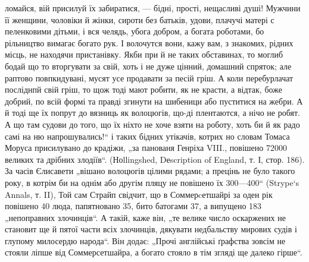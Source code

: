 ломайся, вій присилуй їх забиратися, — бідні, прості, нещасливі душі!
Мужчини її женщини, чоловіки й жінки, сироти без батьків, удови, плачучі
матері с пеленковими дітьми, і вся челядь, убога добром, а богата
роботами, бо рільництво вимагає богато рук. І волочутся вони, кажу вам,
з знакомих, рідних місць, не находячи пристанівку. Якби при й не таких
обставинах, то моглиб бодай що то вторгувати за свій, хоть і не дуже
цінний, домашний спряток; але раптово повпкидувані, мусят усе продавати
за песій гріш. А коли перебурлачат посліднпй свій гріш, то щож
тоді мают робити, як не красти, а відтак, боже добрий, по всій формі та
правді згинути на шибеници або пуститися на жебри. А й тоді ще їх
попрут до вязниць як волоцюгів, що-ді плентаются, а нічо не робят.
А що там судови до того, що їх ніхто не хоче взяти на роботу, хоть би
й як радо самі на ню напрошувались!“ і таких бідних утікачів, котрих
но словам Томаса Моруса присилувано до крадіжи, „за панованя Генріха
VIII., повішено 72000 великих та дрібних злодіїв“. (Ноllingshed, Dеscription
of England, т. І, стор. 186). За часів Єлисавети „вішано волоцюгів
цілими рядами; а прецінь не було такого року, в котрім би на
однім або другім пляцу не повішено їх 300—400“ (Strype`s Annals, т. II),
Той сам Страйп свідчит, що в Соммерcетшайрі за оден рік повішено 40
люда, папятновано 35, бито батогами 37, а випущено 183 „непоправних
злочинців“. А такій, каже він, „те велике число оскаржених не становит
ще й пятої части всіх злочинців, дякувати недбальству мирових судів
і глупому милосердю народа“. Він додає: „Прочі англійські ґрафства
зовсім не стояли ліпше від Соммерсетшайра, а богато стояло в тім згляді
ще далеко гірше“.
\parbreak{}

